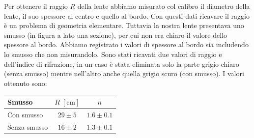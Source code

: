 Per ottenere il raggio $R$ della lente abbiamo misurato col calibro il diametro della lente, il suo spessore al centro e quello al bordo. Con questi dati ricavare il raggio è un problema di geometria elementare. Tuttavia la nostra lente presentava uno smusso (in figura a lato una sezione), per cui non era chiaro il valore dello spessore al bordo. Abbiamo registrato i valori di spessore al bordo sia includendo lo smusso che non misurandolo. Sono stati ricavati due valori di raggio e dell'indice di rifrazione, in un caso è stata eliminata solo la parte grigio chiaro (senza smusso) mentre nell'altro anche quella grigio scuro (con smusso). I valori ottenuto sono:

\begin{table}[H]
    \centering
    \small
    \begin{tabular}{l c c}
        \toprule
        Smusso & $R \; [\si{\centi\metre}]$ & $n$ \\
        \midrule
		Con smusso & $29 \pm 5$ & $1.6 \pm 0.1$  \\
		Senza smusso & $16 \pm 2$ & $1.3 \pm 0.1$ \\
        \bottomrule
    \end{tabular}
\end{table}







